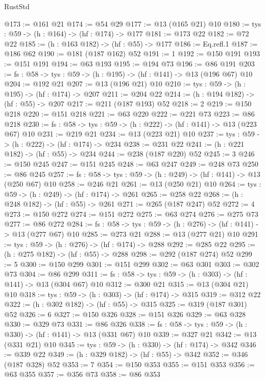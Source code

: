 \begin{lexlean}{RustStd}
\begin{coremodule}
@173 := @161 @21
@174 := @54 @29
@177 := @13 (@165 @21) @10
@180 := {tys : @59} -> (h : @164) -> (hf : @174) -> @177
@181 := @173 @22
@182 := @72 @22
@185 := (h : @163 @182) -> (hf : @55) -> @177
@186 := Eq.refl.{1}
@187 := @186 @62
@190 := @181 (@187 @162) @52
@191 := 1
@192 := @150 @191
@193 := @151 @191
@194 := @63 @193
@195 := @194 @73
@196 := @86 @191
@203 := {fs : @58} -> {tys : @59} -> (h : @195) -> (hf : @141) -> @13 (@196 @67) @10
@204 := @192 @21
@207 := @13 (@196 @21) @10
@210 := {tys : @59} -> (h : @195) -> (hf : @174) -> @207
@211 := @204 @22
@214 := (h : @194 @182) -> (hf : @55) -> @207
@217 := @211 (@187 @193) @52
@218 := 2
@219 := @150 @218
@220 := @151 @218
@221 := @63 @220
@222 := @221 @73
@223 := @86 @218
@230 := {fs : @58} -> {tys : @59} -> (h : @222) -> (hf : @141) -> @13 (@223 @67) @10
@231 := @219 @21
@234 := @13 (@223 @21) @10
@237 := {tys : @59} -> (h : @222) -> (hf : @174) -> @234
@238 := @231 @22
@241 := (h : @221 @182) -> (hf : @55) -> @234
@244 := @238 (@187 @220) @52
@245 := 3
@246 := @150 @245
@247 := @151 @245
@248 := @63 @247
@249 := @248 @73
@250 := @86 @245
@257 := {fs : @58} -> {tys : @59} -> (h : @249) -> (hf : @141) -> @13 (@250 @67) @10
@258 := @246 @21
@261 := @13 (@250 @21) @10
@264 := {tys : @59} -> (h : @249) -> (hf : @174) -> @261
@265 := @258 @22
@268 := (h : @248 @182) -> (hf : @55) -> @261
@271 := @265 (@187 @247) @52
@272 := 4
@273 := @150 @272
@274 := @151 @272
@275 := @63 @274
@276 := @275 @73
@277 := @86 @272
@284 := {fs : @58} -> {tys : @59} -> (h : @276) -> (hf : @141) -> @13 (@277 @67) @10
@285 := @273 @21
@288 := @13 (@277 @21) @10
@291 := {tys : @59} -> (h : @276) -> (hf : @174) -> @288
@292 := @285 @22
@295 := (h : @275 @182) -> (hf : @55) -> @288
@298 := @292 (@187 @274) @52
@299 := 5
@300 := @150 @299
@301 := @151 @299
@302 := @63 @301
@303 := @302 @73
@304 := @86 @299
@311 := {fs : @58} -> {tys : @59} -> (h : @303) -> (hf : @141) -> @13 (@304 @67) @10
@312 := @300 @21
@315 := @13 (@304 @21) @10
@318 := {tys : @59} -> (h : @303) -> (hf : @174) -> @315
@319 := @312 @22
@322 := (h : @302 @182) -> (hf : @55) -> @315
@325 := @319 (@187 @301) @52
@326 := 6
@327 := @150 @326
@328 := @151 @326
@329 := @63 @328
@330 := @329 @73
@331 := @86 @326
@338 := {fs : @58} -> {tys : @59} -> (h : @330) -> (hf : @141) -> @13 (@331 @67) @10
@339 := @327 @21
@342 := @13 (@331 @21) @10
@345 := {tys : @59} -> (h : @330) -> (hf : @174) -> @342
@346 := @339 @22
@349 := (h : @329 @182) -> (hf : @55) -> @342
@352 := @346 (@187 @328) @52
@353 := 7
@354 := @150 @353
@355 := @151 @353
@356 := @63 @355
@357 := @356 @73
@358 := @86 @353

\end{coremodule}
\end{lexlean}

